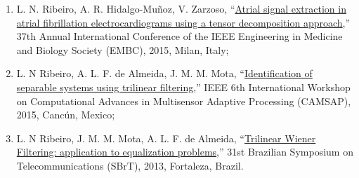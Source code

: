 \begin{enumerate}
	\item L. N. Ribeiro, A. R. Hidalgo-Mu\~{n}oz, V. Zarzoso, ``\href{https://doi.org/10.1109/EMBC.2015.7320000}{Atrial signal extraction in atrial fibrillation electrocardiograms using a tensor decomposition approach},'' 37th Annual International Conference of the IEEE Engineering in Medicine and Biology Society (EMBC), 2015, Milan, Italy;
	
	 \item L. N Ribeiro,  A. L. F. de Almeida, J. M. M. Mota, ``\href{https://doi.org/10.1109/CAMSAP.2015.7383768}{Identification of separable systems using trilinear filtering},'' IEEE 6th International Workshop on Computational Advances in Multisensor Adaptive Processing (CAMSAP), 2015, Canc\'{u}n, Mexico;
	
	 \item L. N Ribeiro, J. M. M. Mota, A. L. F. de Almeida, ``\href{https://github.com/lnribeiro/lnribeiro.github.io/blob/master/assets/pdf/sbrt13.pdf}{Trilinear Wiener Filtering: application to equalization problems},''  31st Brazilian Symposium on Telecommunications (SBrT), 2013, Fortaleza, Brazil.
\end{enumerate}